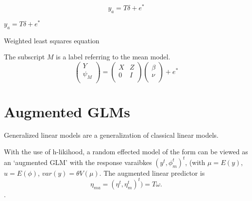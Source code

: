 \documentclass[Main.tex]{subfiles}
\begin{document}
\begin{equation}
y_{a} = T \delta + e^{*}
\end{equation}



$y_{a} = T \delta + e^{*}$


Weighted least squares equation





The subscript $M$ is a label referring to the mean model.
\begin{equation}
\left(%
\begin{array}{c}
Y \\
\psi_{M} \\
\end{array}%
\right) = \left(
\begin{array}{cc}
X & Z \\
0 & I \\
\end{array}\right) \left(%
\begin{array}{c}
\beta \\
\nu \\
\end{array}%
\right)+ e^{*}
\end{equation}






\section{Augmented GLMs} 




Generalized linear models are a generalization of classical linear  models.

With the use of h-likihood, a random effected model of the form can be viewed as an `augmented GLM' with the response varaibkes $(y^t, \phi^t_m)^t$, (with $\mu = E(y)$,$ u = E(\phi)$, $var(y) = \theta V (\mu)$.
The augmented linear predictor is \[\eta_{ma}  = (\eta^t, \eta^t_m)^t) = T\omega. \].



\end{document}
